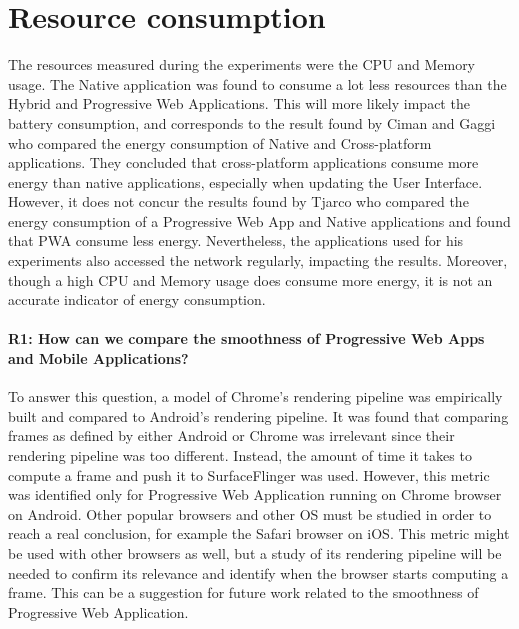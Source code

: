 \documentclass{kththesis}
\begin{document}
\section{Resource consumption}
The resources measured during the experiments were the CPU and Memory usage. The Native application was found to consume a lot less resources than the Hybrid and Progressive Web Applications. This will more likely impact the battery consumption, and corresponds to the result found by Ciman and Gaggi \cite{ciman2017empirical} who compared the energy consumption of Native and Cross-platform applications. They concluded that cross-platform applications consume more energy than native applications, especially when updating the User Interface. However, it does not concur the results found by Tjarco \cite{PWAapplicability} who compared the energy consumption of a Progressive Web App and Native applications and found that PWA consume less energy. Nevertheless, the applications used for his experiments also accessed the network regularly, impacting the results. Moreover, though a high CPU and Memory usage does consume more energy, it is not an accurate indicator of energy consumption.


\iffalse
{}

\paragraph{R1: How can we compare the smoothness of Progressive Web Apps and Mobile Applications?}
To answer this question, a model of Chrome's rendering pipeline was empirically built and compared to Android's rendering pipeline. It was found that comparing frames as defined by either Android or Chrome was irrelevant since their rendering pipeline was too different. Instead, the amount of time it takes to compute a frame and push it to SurfaceFlinger was used. \newline
However, this metric was identified only for Progressive Web Application running on Chrome browser on Android. Other popular browsers and other OS must be studied in order to reach a real conclusion, for example the Safari browser on iOS. This metric might be used with other browsers as well, but a study of its rendering pipeline will be needed to confirm its relevance and identify when the browser starts computing a frame. This can be a suggestion for future work related to the smoothness of Progressive Web Application. 
\end{document}
